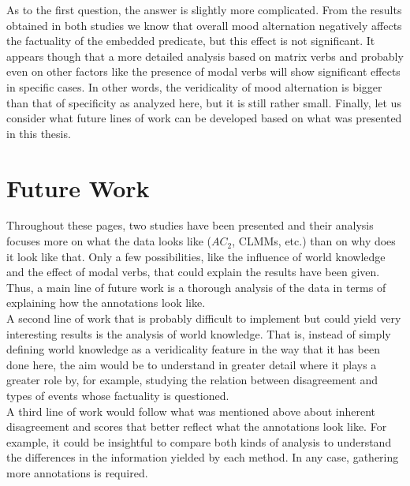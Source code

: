 As to the first question, the answer is slightly more complicated. From the results obtained in both studies we know that overall mood alternation negatively affects the factuality of the embedded predicate, but this effect is not significant. It appears though that a more detailed analysis based on matrix verbs and probably even on other factors like the presence of modal verbs will show significant effects in specific cases. In other words, the veridicality of mood alternation is bigger than that of specificity as analyzed here, but it is still rather small. Finally, let us consider what future lines of work can be developed based on what was presented in this thesis.\\

\section{Future Work}
Throughout these pages, two studies have been presented and their analysis focuses more on what the data looks like ($AC_2$, CLMMs, etc.) than on why does it look like that. Only a few possibilities, like the influence of world knowledge and the effect of modal verbs, that could explain the results have been given. Thus, a main line of future work is a thorough analysis of the data in terms of explaining how the annotations look like.\\

A second line of work that is probably difficult to implement but could yield very interesting results is the analysis of world knowledge. That is, instead of simply defining world knowledge as a veridicality feature in the way that it has been done here, the aim would be to understand in greater detail where it plays a greater role by, for example, studying the relation between disagreement and types of events whose factuality is questioned.\\ 

A third line of work would follow what was mentioned above about inherent disagreement and scores that better reflect what the annotations look like. For example, it could be insightful to compare both kinds of analysis to understand the differences in the information yielded by each method. In any case, gathering more annotations is required.\\

